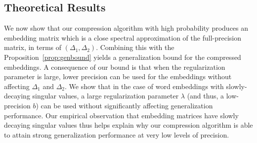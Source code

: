 \subsection{Theoretical Results}
We now show that our compression algorithm with high probability produces an embedding matrix which is a close spectral approximation of the full-precision matrix, in terms of $(\Delta_1,\Delta_2)$.
Combining this with the Proposition~\ref{prop:genbound} yields a generalization bound for the compressed embeddings.
A consequence of our bound is that when the regularization parameter is large, lower precision can be used for the embeddings without affecting $\Delta_1$ and $\Delta_2$.
We show that in the case of word embeddings with slowly-decaying singular values, a large regularization parameter $\lambda$ (and thus, a low-precision $b$) can be used without significantly affecting generalization performance.
Our empirical observation that embedding matrices have slowly decaying singular values thus helps explain why our compression algorithm is able to attain strong generalization performance at very low levels of precision.

